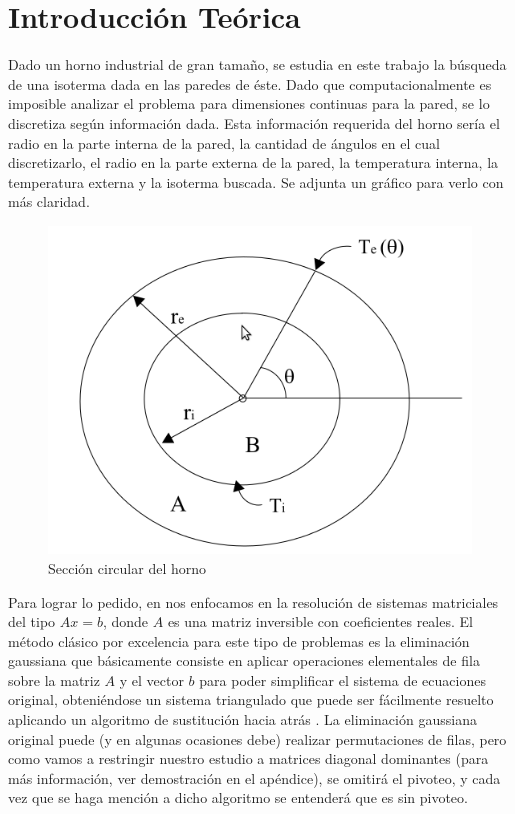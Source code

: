 \section{Introducción Teórica}
%
Dado un horno industrial de gran tamaño, se estudia en este trabajo la búsqueda de una isoterma dada
en las paredes de éste. Dado que computacionalmente es imposible analizar el problema para
dimensiones continuas para la pared, se lo discretiza según información dada. Esta información
requerida del horno sería el radio en la parte interna de la pared, la cantidad de ángulos en el cual
discretizarlo, el radio en la parte externa de la pared, la temperatura interna, la temperatura
externa y la isoterma buscada. Se adjunta un gráfico para verlo con más claridad.

\begin{figure}[ht]
  \begin {center}
    \includegraphics[width=0.6\columnwidth]{Horno.png}
    \caption{Sección circular del horno}
  \end{center}
\end{figure}

Para lograr lo pedido, en nos enfocamos en la resolución de sistemas matriciales del tipo $Ax=b$,
donde $A$ es una matriz inversible con coeficientes reales. El método clásico por excelencia para
este tipo de problemas es la eliminación gaussiana que básicamente consiste en aplicar operaciones
elementales de fila sobre la matriz $A$ y el vector $b$ para poder simplificar el sistema de
ecuaciones original, obteniéndose un sistema triangulado que puede ser fácilmente resuelto aplicando
un algoritmo de sustitución hacia atrás \cite[6.1]{burden}. La eliminación gaussiana original puede
(y en algunas ocasiones debe) realizar permutaciones de filas, pero como vamos a restringir nuestro
estudio a matrices diagonal dominantes (para más información, ver demostración en el apéndice), se
omitirá el pivoteo, y cada vez que se haga mención a dicho algoritmo se entenderá que es sin
pivoteo.

